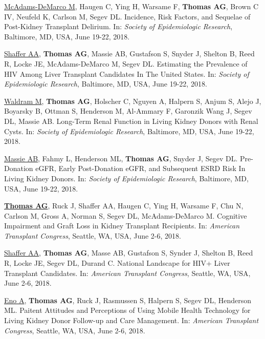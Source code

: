 \documentclass[10pt]{article}
\makeatletter
\newlength{\bibhang}
\newlength{\bibsep}
 {\@listi \global\bibsep\itemsep \global\advance\bibsep by\parsep}
\newenvironment{bibenum*}
  {\renewcommand\labelenumi{[\theenumi]}%
   \etaremune[
     topsep=0pt,
     itemsep=\bibsep,
     parsep=0pt,partopsep=0pt,
     itemindent=-\bibhang,
     leftmargin={\bibhang+\widthof{[999]}}]}
  {\endetaremune}
\makeatother
\begin{document}
\begin{bibenum*}
\item \underline{McAdams-DeMarco M}, Haugen C, Ying H, Warsame F,
  \textbf{Thomas AG}, Brown C IV, Neufeld K, Carlson M, Segev DL.
  Incidence, Risk Factors, and Sequelae of Post-Kidney Transplant Delirium.
  In: \emph{Society of Epidemiologic Research},
  Baltimore, MD, USA, June 19-22, 2018.

\item \underline{Shaffer AA}, \textbf{Thomas AG}, Massie AB, Gustafson S,
  Snyder J, Shelton B, Reed R, Locke JE, McAdams-DeMarco M, Segev DL.
  Estimating the Prevalence of HIV Among Liver Transplant Candidates
  In The United States.
  In: \emph{Society of Epidemiologic Research},
  Baltimore, MD, USA, June 19-22, 2018.

\item \underline{Waldram M}, \textbf{Thomas AG}, Holscher C, Nguyen A,
  Halpern S, Anjum S, Alejo J, Boyarsky B, Ottman S, Henderson M,
  Al-Ammary F, Garonzik Wang J, Segev DL, Massie AB.
  Long-Term Renal Function in Living Kidney Donors with Renal Cysts.
  In: \emph{Society of Epidemiologic Research},
  Baltimore, MD, USA, June 19-22, 2018.

\item \underline{Massie AB}, Fahmy L, Henderson ML, \textbf{Thomas AG},
  Snyder J, Segev DL.
  Pre-Donation eGFR, Early Post-Donation eGFR, and Subsequent ESRD Risk
  In Living Kidney Donors.
  In: \emph{Society of Epidemiologic Research},
  Baltimore, MD, USA, June 19-22, 2018.

\item \underline{\textbf{Thomas AG}}, Ruck J, Shaffer AA, Haugen C,
  Ying H, Warsame F, Chu N, Carlson M, Gross A, Norman S, Segev DL,
  McAdams-DeMarco M.
  Cognitive Impairment and Graft Loss in Kidney Transplant Recipients.
  In: \emph{American Transplant Congress},
  Seattle, WA, USA, June 2-6, 2018.

\item \underline{Shaffer AA}, \textbf{Thomas AG}, Masse AB, Gustafson S,
  Synder J, Shelton B, Reed R, Locke JE, Segev DL, Durand C.
  National Landscape for HIV+ Liver Transplant Candidates.
  In: \emph{American Transplant Congress},
  Seattle, WA, USA, June 2-6, 2018.

\item \underline{Eno A}, \textbf{Thomas AG}, Ruck J, Rasmussen S,
  Halpern S, Segev DL, Henderson ML.
  Paitent Attitudes and Perceptions of Using Mobile Health Technology
  for Living Kidney Donor Follow-up and Care Management.
  In: \emph{American Transplant Congress},
  Seattle, WA, USA, June 2-6, 2018.


\end{bibenum*}
\end{document}
